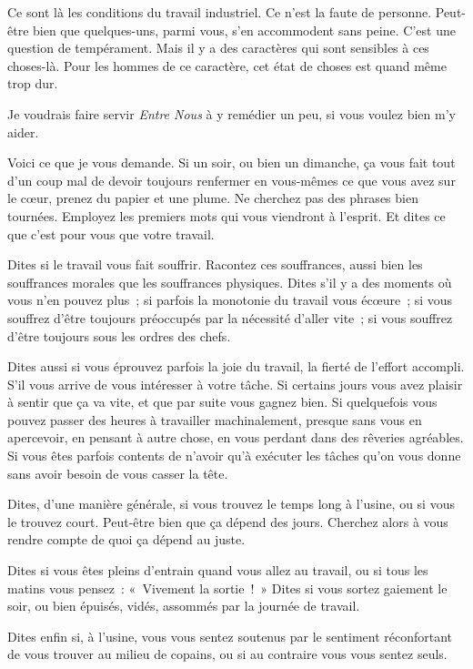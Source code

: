 \documentclass[french,twoside]{book} %
\begin{document}
Ce sont là les conditions du travail industriel. Ce n'est la faute de personne. Peut-être bien que quelques-uns, parmi vous, s'en accommodent sans peine. C'est une question de tempérament. Mais il y a des caractères qui sont sensibles à ces choses-là. Pour les hommes de ce caractère, cet état de choses est quand même trop dur.\par
Je voudrais faire servir {\itshape Entre Nous} à y remédier un peu, si vous voulez bien m'y aider.\par
Voici ce que je vous demande. Si un soir, ou bien un dimanche, ça vous fait tout d'un coup mal de devoir toujours renfermer en vous-mêmes ce que vous avez sur le cœur, prenez du papier et une plume. Ne cherchez pas des phrases bien tournées. Employez les premiers mots qui vous viendront à l'esprit. Et dites ce que c'est pour vous que votre travail.\par
Dites si le travail vous fait souffrir. Racontez ces souffrances, aussi bien les souffrances morales que les souffrances physiques. Dites s'il y a des moments où vous n'en pouvez plus ; si parfois la monotonie du travail vous écœure ; si vous souffrez d'être toujours préoccupés par la nécessité d'aller vite ; si vous souffrez d'être toujours sous les ordres des chefs.\par
Dites aussi si vous éprouvez parfois la joie du travail, la fierté de l'effort accompli. S'il vous arrive de vous intéresser à votre tâche. Si certains jours vous avez plaisir à sentir que ça va vite, et que par suite vous gagnez bien. Si quelquefois vous pouvez passer des heures à travailler machinalement, presque sans vous en apercevoir, en pensant à autre chose, en vous perdant dans des rêveries agréables. Si vous êtes parfois contents de n'avoir qu'à exécuter les tâches qu'on vous donne sans avoir besoin de vous casser la tête.\par
Dites, d'une manière générale, si vous trouvez le temps long à l'usine, ou si vous le trouvez court. Peut-être bien que ça dépend des jours. Cherchez alors à vous rendre compte de quoi ça dépend au juste.\par
Dites si vous êtes pleins d'entrain quand vous allez au travail, ou si tous les matins vous pensez : « Vivement la sortie ! » Dites si vous sortez gaiement le soir, ou bien épuisés, vidés, assommés par la journée de travail.\par
Dites enfin si, à l'usine, vous vous sentez soutenus par le sentiment réconfortant de vous trouver au milieu de copains, ou si au contraire vous vous sentez seuls.\par
\end{document}
